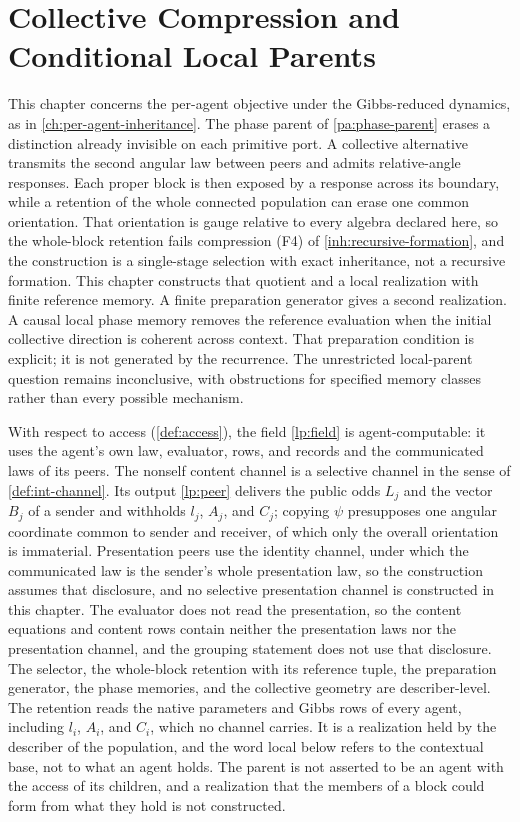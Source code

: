 \chapter{Collective Compression and Conditional Local Parents}
\label{ch:collective-local-parent}

This chapter concerns the per-agent objective under the Gibbs-reduced dynamics, as in \cref{ch:per-agent-inheritance}. The phase parent of \cref{pa:phase-parent} erases a distinction already invisible on each primitive port. A collective alternative transmits the second angular law between peers and admits relative-angle responses. Each proper block is then exposed by a response across its boundary, while a retention of the whole connected population can erase one common orientation. That orientation is gauge relative to every algebra declared here, so the whole-block retention fails compression (F4) of \cref{inh:recursive-formation}, and the construction is a single-stage selection with exact inheritance, not a recursive formation. This chapter constructs that quotient and a local realization with finite reference memory. A finite preparation generator gives a second realization. A causal local phase memory removes the reference evaluation when the initial collective direction is coherent across context. That preparation condition is explicit; it is not generated by the recurrence. The unrestricted local-parent question remains inconclusive, with obstructions for specified memory classes rather than every possible mechanism.

With respect to access (\cref{def:access}), the field \cref{lp:field} is agent-computable: it uses the agent's own law, evaluator, rows, and records and the communicated laws of its peers. The nonself content channel is a selective channel in the sense of \cref{def:int-channel}. Its output \cref{lp:peer} delivers the public odds $L_j$ and the vector $B_j$ of a sender and withholds $l_j$, $A_j$, and $C_j$; copying $\psi$ presupposes one angular coordinate common to sender and receiver, of which only the overall orientation is immaterial. Presentation peers use the identity channel, under which the communicated law is the sender's whole presentation law, so the construction assumes that disclosure, and no selective presentation channel is constructed in this chapter. The evaluator does not read the presentation, so the content equations and content rows contain neither the presentation laws nor the presentation channel, and the grouping statement does not use that disclosure. The selector, the whole-block retention with its reference tuple, the preparation generator, the phase memories, and the collective geometry are describer-level. The retention reads the native parameters and Gibbs rows of every agent, including $l_i$, $A_i$, and $C_i$, which no channel carries. It is a realization held by the describer of the population, and the word local below refers to the contextual base, not to what an agent holds. The parent is not asserted to be an agent with the access of its children, and a realization that the members of a block could form from what they hold is not constructed.

